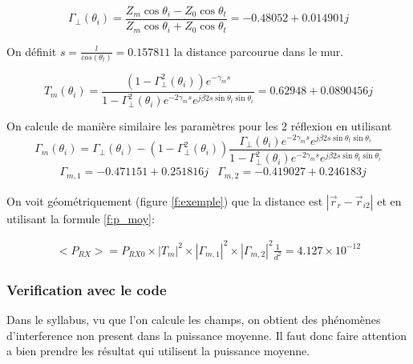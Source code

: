 \documentclass[sn-mathphys-num]{sn-jnl}%
\theoremstyle{thmstyleone}%
\theoremstyle{thmstyletwo}%
\theoremstyle{thmstylethree}%
\begin{document}
\begin{equation}
    \Gamma_{\perp}\left(\theta_i\right)=\frac{Z_m \cos \theta_i-Z_0 \cos \theta_t}{Z_m \cos \theta_i+Z_0 \cos \theta_t} = -0.48052 + 0.014901j 
\end{equation}

On définit $s = \frac{l}{cos(\theta_t)} = 0.157811$ la distance parcourue dans le mur.

\begin{equation}
    T_m\left(\theta_i\right)=\frac{\left(1-\Gamma_{\perp}^2\left(\theta_i\right)\right) e^{-\gamma_m s}}{1-\Gamma_{\perp}^2\left(\theta_i\right) e^{-2 \gamma_m s} e^{j \beta 2 s \sin \theta_t \sin \theta_i}}=
    0.62948 + 0.0890456j
\end{equation}

On calcule de manière similaire les paramètres pour les 2 réflexion en utilisant
\begin{equation}
    \Gamma_{m}\left(\theta_i\right)=\Gamma_{\perp}\left(\theta_i\right)-\left(1-\Gamma_{\perp}^2\left(\theta_i\right)\right) \frac{\Gamma_{\perp}\left(\theta_i\right) e^{-2 \gamma_m s} e^{j \beta 2 s \sin \theta_t \sin \theta_i}}{1-\Gamma_{\perp}^2\left(\theta_i\right) e^{-2 \gamma_m s} e^{j \beta 2 s \sin \theta_t \sin \theta_i}}
\end{equation}
\begin{align}
    &\Gamma_{m,1} = -0.471151 + 0.251816j 
    &\Gamma_{m,2} = -0.419027 + 0.246183j
\end{align}

On voit géométriquement (figure \ref{f:exemple}) que la distance est $|\vec{r}_r - \vec{r}_{i2}|$ et en utilisant la formule \eqref{f:p_moy}:

\begin{align}
    <P_{RX}> = P_{RX0} \times |T_{m}|^2 \times |\Gamma_{m,1}|^2 \times |\Gamma_{m,2}|^2 \frac{1}{d^2} = 4.127 \times 10^{-12}
\end{align}

\subsubsection{Verification avec le code}

Dans le syllabus, vu que l'on calcule les champs, on obtient des phénomènes 
d'interference non present dans la puissance moyenne. Il faut donc
faire attention a bien prendre les résultat qui utilisent la puissance moyenne.
\end{document}
